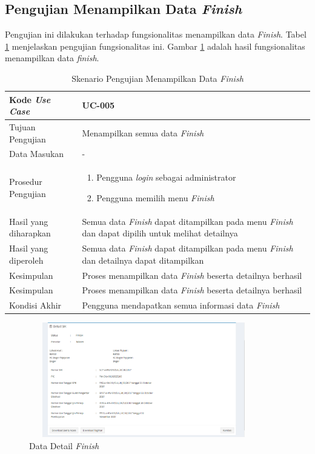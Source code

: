 \subsection{Pengujian Menampilkan Data \textit{Finish}}
Pengujian ini dilakukan terhadap fungsionalitas menampilkan data \textit{Finish}. Tabel \ref{tab:list_finish} menjelaskan pengujian fungsionalitas ini. Gambar \ref{figure:data_detail_finish} adalah hasil fungsionalitas menampilkan data \textit{finish}.

\begin{table}[h!]
	\centering
	\begin{tabular}{|p{4cm}|p{6cm}|}
	\hline
	Kode \textit{Use Case} & UC-005\\ \hline
	Tujuan Pengujian & Menampilkan semua data \textit{Finish}\\ \hline
	Data Masukan & - \\ \hline
	Prosedur Pengujian & 
		\begin{enumerate}
		\item Pengguna \textit{login} sebagai administrator
		\item Pengguna memilih menu \textit{Finish}
		\end{enumerate}\\ \hline
	Hasil yang diharapkan & Semua data \textit{Finish} dapat ditampilkan pada menu \textit{Finish} dan dapat dipilih untuk melihat detailnya \\ \hline
	Hasil yang diperoleh & Semua data \textit{Finish} dapat ditampilkan pada menu \textit{Finish} dan detailnya dapat ditampilkan\\ \hline
	Kesimpulan & Proses menampilkan data \textit{Finish} beserta detailnya berhasil\\ \hline
	Kesimpulan & Proses menampilkan data \textit{Finish} beserta detailnya berhasil\\ \hline
	Kondisi Akhir & Pengguna mendapatkan semua informasi data \textit{Finish}\\ \hline
	\end{tabular}\caption{Skenario Pengujian Menampilkan Data \textit{Finish}}
	\label{tab:list_finish}
\end{table}

\begin{figure}[h!]
\centerline
{\includegraphics[width=10cm,height=5cm]{bab6/finish.png}}
\caption{Data Detail \textit{Finish}}
\label{figure:data_detail_finish}
\end{figure}

